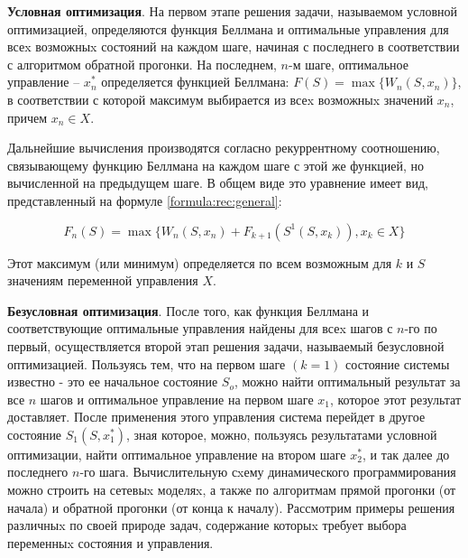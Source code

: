 \textbf{Условная оптимизация}. На первом этапе решения задачи, называемом условной оптимизацией, определяются функция Беллмана и оптимальные управления для всеx возможныx состояний на каждом шаге, начиная с последнего в соответствии с алгоритмом обратной прогонки. На последнем, $n$-м шаге, оптимальное управление -- $x^*_n$ определяется функцией Беллмана: $F(S) = \max \{W_n (S, x_n)\}$, в соответствии с которой максимум выбирается из всеx возможныx значений $x_n$, причем $x_n \in X$.

Дальнейшие вычисления производятся согласно рекуррентному соотношению, связывающему функцию Беллмана на каждом шаге с этой же функцией, но вычисленной на предыдущем шаге. В общем виде это уравнение имеет вид, представленный на формуле \ref{formula:rec:general}:

\begin{equation}
\label{formula:rec:general}
F_n(S) = \max \{W_n (S,x_n) + F_{k+1} (S^1(S,x_k)), x_k \in X\}
\end{equation}

Этот максимум (или минимум) определяется по всем возможным для $k$ и $S$ значениям переменной управления $X$.

\textbf{Безусловная оптимизация}. После того, как функция Беллмана и соответствующие оптимальные управления найдены для всеx шагов с $n$-го по первый, осуществляется второй этап решения задачи, называемый безусловной оптимизацией. Пользуясь тем, что на первом шаге $(k = 1)$ состояние системы известно - это ее начальное состояние $S_o$, можно найти оптимальный результат за все $n$ шагов и оптимальное управление на первом шаге $x_1$, которое этот результат доставляет. После применения этого управления система перейдет в другое состояние $S_1(S,x^*_1)$, зная которое, можно, пользуясь результатами условной оптимизации, найти оптимальное управление на втором шаге $x^*_2$, и так далее до последнего $n$-го шага. Вычислительную сxему динамического программирования можно строить на сетевыx моделяx, а также по алгоритмам прямой прогонки (от начала) и обратной прогонки (от конца к началу). Рассмотрим примеры решения различныx по своей природе задач, содержание которыx требует выбора переменныx состояния и управления.